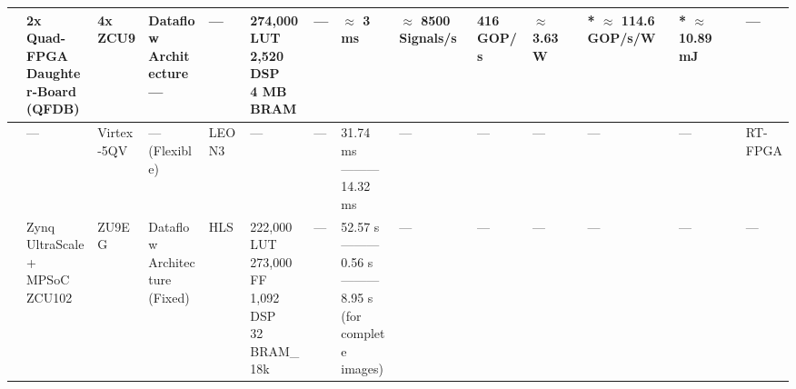 \begin{center}
{\begin{tabular}{llllllllllllll}
\cite{pitsisEfficientConvolutionalNeural2019} & \makecell[tl]{2x Quad-FPGA\\ Daughter-Board\\ (QFDB)} & 4x ZCU9 & \makecell[tl]{Dataflow\\ Architecture \\ ---} & --- & \makecell[tl]{274,000 LUT\\ 2,520 DSP\\ 4 MB BRAM} & --- & $\approx$ 3 ms & \makecell[tl]{$\approx$ 8500\\ Signals/s} & 416 GOP/s & $\approx$ 3.63 W & * \makecell[tl]{$\approx$ 114.6\\ GOP/s/W} & * $\approx$ 10.89 mJ & --- \\ \hline
\cite{kesumaArtificialIntelligenceImplementation2019} & --- & Virtex-5QV & \makecell[tl]{---\\ (Flexible)} & LEON3 & --- & --- & \makecell[tl]{31.74 ms\\ ---------\\ 14.32 ms} & --- & --- & --- & --- & --- & RT-FPGA \\ \hline
\cite{maLightweightHyperspectralImage2019} & \makecell[tl]{Zynq\\ UltraScale+\\ MPSoC\\ ZCU102} & ZU9EG & \makecell[tl]{Dataflow\\ Architecture\\ (Fixed)} & HLS & \makecell[tl]{222,000 LUT\\ 273,000 FF\\ 1,092 DSP\\ 32 BRAM\_18k} & --- & \makecell[tl]{52.57 s\\ ---------\\ 0.56 s\\ ---------\\ 8.95 s\\ (for complete\\ images)} & --- & --- & --- & --- & --- & --- \\ \hline

\end{tabular}}
\end{center}
